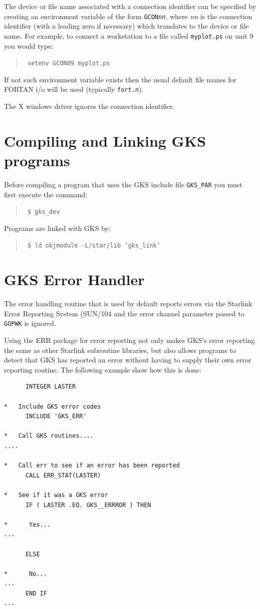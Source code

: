\documentclass[11pt]{article}
\newcommand{\xref}[3]{#1}
\begin{document}
The device or file name associated with a connection identifier can be
specified by creating an environment variable of the form {\tt GCON{\em{nn}}},
where {\em nn} is the connection identifier (with a leading zero if
necessary)
which translates to the device or file name.
For example, to connect a workstation to a file called {\tt myplot.ps}
on unit 9 you would type:
\begin{quote}{\tt
setenv GCON09 myplot.ps
}\end{quote}
If not such environment variable exists then the usual default file names
for FORTAN i/o will be used (typically {\tt fort.{\em{n}}}).

The X windows driver ignores the connection identifier.

\section{Compiling and Linking GKS programs}
Before compiling a program that uses the GKS include file {\tt GKS\_PAR}
you must first execute the
command:
\begin{quote}\tt
\$ gks\_dev
\end{quote}

Programs are linked with GKS by:
\begin{quote}\tt
\$ ld objmodule -L/star/lib `gks\_link`
\end{quote}

\section{GKS Error Handler}
The error handling routine that is used by default reports errors via the
Starlink Error Reporting System (\xref{SUN/104}{sun104}) and the error
channel parameter passed to {\tt GOPWK} is ignored.

Using the ERR package for error reporting not only makes GKS's error reporting
the same as other Starlink subroutine libraries, but also allows programs
to detect that GKS has reported an error without having to supply their
own error reporting routine. The following example show how this is
done:
\begin{verbatim}
      INTEGER LASTER

*   Include GKS error codes
      INCLUDE 'GKS_ERR'

*   Call GKS routines....
....

*   Call err to see if an error has been reported
      CALL ERR_STAT(LASTER)

*   See if it was a GKS error
      IF ( LASTER .EQ. GKS__ERRROR ) THEN

*      Yes...
...

      ELSE

*      No...
...
      END IF
...
\end{verbatim}
\end{document}

